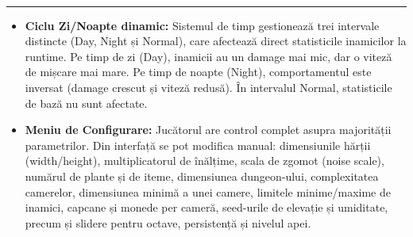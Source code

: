 \documentclass[11pt,a4paper]{article}
\begin{document}
\vspace{0.4cm}
 \\
\rule{\textwidth}{0.8pt}
\begin{itemize}[itemsep=2pt, topsep=2pt, parsep=0pt, leftmargin=*]
    \item \textbf{Ciclu Zi/Noapte dinamic:} Sistemul de timp gestionează trei intervale distincte (Day, Night și Normal), care afectează direct statisticile inamicilor la runtime. Pe timp de zi (Day), inamicii au un damage mai mic, dar o viteză de mișcare mai mare. Pe timp de noapte (Night), comportamentul este inversat (damage crescut și viteză redusă). În intervalul Normal, statisticile de bază nu sunt afectate.
    \item \textbf{Meniu de Configurare:} Jucătorul are control complet asupra majorității parametrilor. Din interfață se pot modifica manual: dimensiunile hărții (width/height), multiplicatorul de înălțime, scala de zgomot (noise scale), numărul de plante și de iteme, dimensiunea dungeon-ului, complexitatea camerelor, dimensiunea minimă a unei camere, limitele minime/maxime de inamici, capcane și monede per cameră, seed-urile de elevație și umiditate, precum și slidere pentru octave, persistență și nivelul apei.
\end{itemize}
\end{document}
